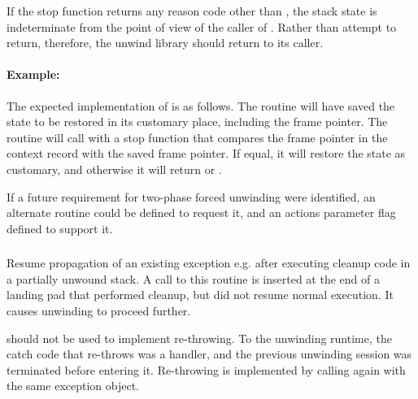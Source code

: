 \begin{sloppypar}
If the stop function returns any reason code other than ,
the stack state is indeterminate from the point of view of the caller of
. Rather than attempt to return, therefore,
the unwind library should return  to its caller.
\end{sloppypar}

\paragraph{Example: \\}

\begin{sloppypar}
The expected implementation of  is as follows.
The  routine will have saved the state to be restored in its
customary place, including the frame pointer. The 
routine will call  with a stop function that
compares the frame pointer in the context record with the saved frame
pointer. If equal, it will restore the  state as customary,
and otherwise it will return  or .
\end{sloppypar}

If a future requirement for two-phase forced unwinding were identified,
an alternate routine could be defined to request it, and an actions
parameter flag defined to support it.

\subsubsection{}


Resume propagation of an existing exception e.g. after executing cleanup
code in a partially unwound stack. A call to this routine is inserted
at the end of a landing pad that performed cleanup, but did not resume
normal execution. It causes unwinding to proceed further.

 should not be used to implement re-throwing.
To the unwinding runtime, the catch code that re-throws was a handler,
and the previous unwinding session was terminated before entering it.
Re-throwing is implemented by calling 
again with the same exception object.

